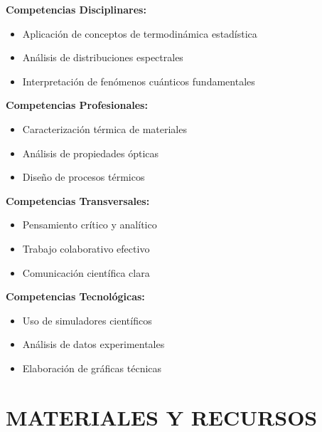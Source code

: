 \documentclass[12pt,a4paper]{article}
\begin{document}
	\begin{competenciabox}
		\begin{multicols}{2}
			\textbf{Competencias Disciplinares:}
			\begin{itemize}[leftmargin=1cm]
				\item Aplicación de conceptos de termodinámica estadística
				\item Análisis de distribuciones espectrales
				\item Interpretación de fenómenos cuánticos fundamentales
			\end{itemize}
			
			\textbf{Competencias Profesionales:}
			\begin{itemize}[leftmargin=1cm]
				\item Caracterización térmica de materiales
				\item Análisis de propiedades ópticas
				\item Diseño de procesos térmicos
			\end{itemize}
			
			\columnbreak
			
			\textbf{Competencias Transversales:}
			\begin{itemize}[leftmargin=1cm]
				\item Pensamiento crítico y analítico
				\item Trabajo colaborativo efectivo
				\item Comunicación científica clara
			\end{itemize}
			
			\textbf{Competencias Tecnológicas:}
			\begin{itemize}[leftmargin=1cm]
				\item Uso de simuladores científicos
				\item Análisis de datos experimentales
				\item Elaboración de gráficas técnicas
			\end{itemize}
		\end{multicols}
	\end{competenciabox}
	
	
	\section{MATERIALES Y RECURSOS}
	
\end{document}
